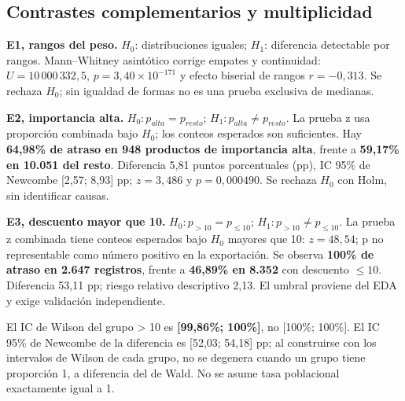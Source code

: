 \documentclass[10pt,a4paper]{article}
\begin{document}
\subsection{Contrastes complementarios y multiplicidad}
\textbf{E1, rangos del peso.} $H_0$: distribuciones iguales; $H_1$: diferencia detectable por rangos. Mann--Whitney asintótico corrige empates y continuidad: $U=10\,000\,332{,}5$, $p=3{,}40\times10^{-171}$ y efecto biserial de rangos $r=-0{,}313$. Se rechaza $H_0$; sin igualdad de formas no es una prueba exclusiva de medianas.

\textbf{E2, importancia alta.} $H_0:p_{alta}=p_{resto}$; $H_1:p_{alta}\ne p_{resto}$. La prueba z usa proporción combinada bajo $H_0$; los conteos esperados son suficientes. Hay \textbf{64,98\% de atraso en 948 productos de importancia alta}, frente a \textbf{59,17\% en 10.051 del resto}. Diferencia 5,81 puntos porcentuales (pp), IC 95\% de Newcombe [2,57; 8,93] pp; $z=3{,}486$ y $p=0{,}000490$. Se rechaza $H_0$ con Holm, sin identificar causas.

\textbf{E3, descuento mayor que 10.} $H_0:p_{>10}=p_{\le10}$; $H_1:p_{>10}\ne p_{\le10}$. La prueba z combinada tiene conteos esperados bajo $H_0$ mayores que 10: $z=48{,}54$; p no representable como número positivo en la exportación. Se observa \textbf{100\% de atraso en 2.647 registros}, frente a \textbf{46,89\% en 8.352} con descuento $\le10$. Diferencia 53,11 pp; riesgo relativo descriptivo 2,13. El umbral proviene del EDA y exige validación independiente.

El IC de Wilson del grupo > 10 es \textbf{[99,86\%; 100\%]}, no [100\%; 100\%]. El IC 95\% de Newcombe de la diferencia es [52,03; 54,18] pp; al construirse con los intervalos de Wilson de cada grupo, no se degenera cuando un grupo tiene proporción 1, a diferencia del de Wald. No se asume tasa poblacional exactamente igual a 1.
\end{document}
